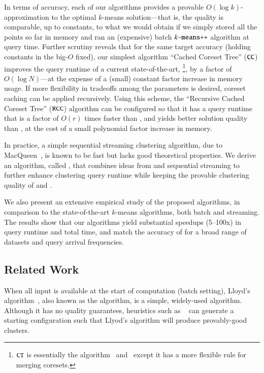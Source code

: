 In terms of accuracy, each of our algorithms provides a provable
$O(\log k)$-approximation to the optimal $k$-means solution---that is, the
quality is comparable, up to constants, to what we would obtain if we simply
stored all the points so far in memory and ran an (expensive) batch $\texttt{$k$-means++}$
algorithm at query time.  Further scrutiny reveals that for the same target
accuracy (holding constants in the big-$O$ fixed), our simplest algorithm
``Cached Coreset Tree'' ($\texttt{CC}$) improves the query runtime of a current
state-of-the-art, \ct{}\footnote{$\texttt{CT}$ is essentially the \skmpp
  algorithm~\cite{AMR+12} and~\cite{AJM09} except it has a more flexible rule
  for merging coresets.}, by a factor of $O(\log N)$---at the expense of a
(small) constant factor increase in memory usage.  If more flexibility in
tradeoffs among the parameters is desired, coreset caching can be applied
recursively.  Using this scheme, the ``Recursive Cached Coreset Tree'' ($\texttt{RCC}$)
algorithm can be configured so that it has a query runtime that is a factor of
$O(r)$ times faster than \ct, and yields better solution quality
than \ct{}, at the cost of a small polynomial factor increase in memory.

In practice, a simple sequential streaming clustering algorithm, due to
MacQueen~\cite{MacQueen67}, is known to be fast but lacks good theoretical
properties.  We derive an algorithm, called \hybrid{}, that combines ideas from
\cc and sequential streaming to further enhance clustering query runtime while
keeping the provable clustering quality of \rcc and \cc.

We also present an extensive empirical study of the proposed algorithms, in
comparison to the state-of-the-art $k$-means algorithms, both batch and
streaming.  The results show that our algorithms yield substantial speedups
(5--100x) in query runtime and total time, and match the accuracy of \skmpp for
a broad range of datasets and query arrival frequencies.


\subsection{Related Work}
\label{sec:related}

When all input is available at the start of computation (batch setting), Lloyd's
algorithm~\cite{Lloyd82}, also known as the \km algorithm, is a simple,
widely-used algorithm.  Although it has no quality guarantees, heuristics such
as \kmpp~\cite{AV07} can generate a starting configuration such that Llyod's
algorithm will produce provably-good clusters.

